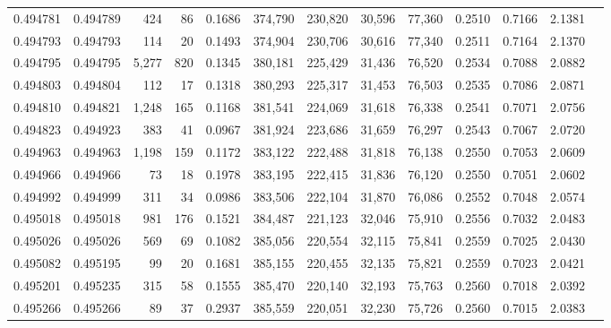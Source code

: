 \begin{tabular}{rrrrrrrrrrrrr}
0.494781 & 0.494789 &   424 &    86 &                                     0.1686 & 374,790 & 230,820 &  30,596 &  77,360 & 0.2510 & 0.7166 & 2.1381 \\
0.494793 & 0.494793 &   114 &    20 &                                     0.1493 & 374,904 & 230,706 &  30,616 &  77,340 & 0.2511 & 0.7164 & 2.1370 \\
0.494795 & 0.494795 & 5,277 &   820 &                                     0.1345 & 380,181 & 225,429 &  31,436 &  76,520 & 0.2534 & 0.7088 & 2.0882 \\
0.494803 & 0.494804 &   112 &    17 &                                     0.1318 & 380,293 & 225,317 &  31,453 &  76,503 & 0.2535 & 0.7086 & 2.0871 \\
0.494810 & 0.494821 & 1,248 &   165 &                                     0.1168 & 381,541 & 224,069 &  31,618 &  76,338 & 0.2541 & 0.7071 & 2.0756 \\
0.494823 & 0.494923 &   383 &    41 &                                     0.0967 & 381,924 & 223,686 &  31,659 &  76,297 & 0.2543 & 0.7067 & 2.0720 \\
0.494963 & 0.494963 & 1,198 &   159 &                                     0.1172 & 383,122 & 222,488 &  31,818 &  76,138 & 0.2550 & 0.7053 & 2.0609 \\
0.494966 & 0.494966 &    73 &    18 &                                     0.1978 & 383,195 & 222,415 &  31,836 &  76,120 & 0.2550 & 0.7051 & 2.0602 \\
0.494992 & 0.494999 &   311 &    34 &                                     0.0986 & 383,506 & 222,104 &  31,870 &  76,086 & 0.2552 & 0.7048 & 2.0574 \\
0.495018 & 0.495018 &   981 &   176 &                                     0.1521 & 384,487 & 221,123 &  32,046 &  75,910 & 0.2556 & 0.7032 & 2.0483 \\
0.495026 & 0.495026 &   569 &    69 &                                     0.1082 & 385,056 & 220,554 &  32,115 &  75,841 & 0.2559 & 0.7025 & 2.0430 \\
0.495082 & 0.495195 &    99 &    20 &                                     0.1681 & 385,155 & 220,455 &  32,135 &  75,821 & 0.2559 & 0.7023 & 2.0421 \\
0.495201 & 0.495235 &   315 &    58 &                                     0.1555 & 385,470 & 220,140 &  32,193 &  75,763 & 0.2560 & 0.7018 & 2.0392 \\
0.495266 & 0.495266 &    89 &    37 &                                     0.2937 & 385,559 & 220,051 &  32,230 &  75,726 & 0.2560 & 0.7015 & 2.0383 \\

\end{tabular}

